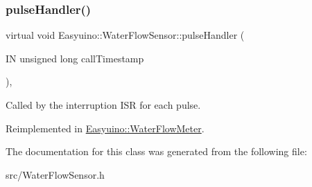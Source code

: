 \subsubsection{\texorpdfstring{pulse\+Handler()}{pulseHandler()}}
{\footnotesize\ttfamily virtual void Easyuino\+::\+Water\+Flow\+Sensor\+::pulse\+Handler (\begin{DoxyParamCaption}\item[{IN unsigned long}]{call\+Timestamp }\end{DoxyParamCaption})\hspace{0.3cm}{\ttfamily [protected]}, {\ttfamily [virtual]}}



Called by the interruption I\+SR for each pulse. 



Reimplemented in \hyperlink{class_easyuino_1_1_water_flow_meter_a9f9b39b7961175f027dad4fe75271569}{Easyuino\+::\+Water\+Flow\+Meter}.



The documentation for this class was generated from the following file\+:\begin{DoxyCompactItemize}
\item 
src/Water\+Flow\+Sensor.\+h\end{DoxyCompactItemize}
